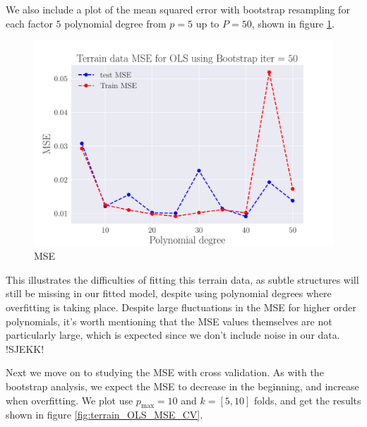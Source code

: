 \documentclass[reprint,english,notitlepage,aps,nobalancelastpage,nofootinbib]{revtex4-1}  %
\begin{document}
We also include a plot of the mean squared error with bootstrap resampling for each factor $5$ polynomial degree from $p=5$ up to $P=50$, shown in figure \ref{fig:terrain_MSE_bootstrap_p50}.

\begin{figure}[H]
  \includegraphics[width=\linewidth]{SRTM_MSE_OLS_n50_pol50_Bootstrap_re50.pdf}
  \caption{MSE}
  \label{fig:terrain_MSE_bootstrap_p50}
\end{figure}

This illustrates the difficulties of fitting this terrain data, as subtle structures will still be missing in our fitted model, despite using polynomial degrees where overfitting is taking place. Despite large fluctuations in the MSE for higher order polynomials, it's worth mentioning that the MSE values themselves are not particularly large, which is expected since we don't include noise in our data. !SJEKK!

Next we move on to studying the MSE with cross validation. As with the bootstrap analysis, we expect the MSE to decrease in the beginning, and increase when overfitting. We plot use $p_\text{max} = 10$ and $k=[5,10]$ folds, and get the results shown in figure \ref{fig:terrain_OLS_MSE_CV}.
\end{document}
